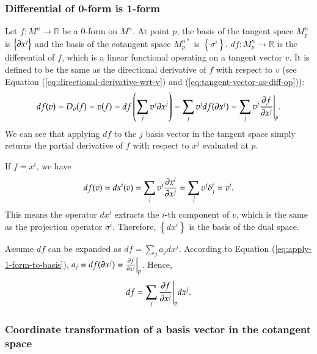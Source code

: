 \documentclass[11pt, a4paper]{book}
\begin{document}
\subsubsection{Differential of 0-form is 1-form}

Let $f: M^n \rightarrow \mathbb{R}$ be a 0-form on $M^n$. At point $p$, the basis of the
tangent space $M_p^n$ is $\left\{ \boldsymbol{\partial}x^j \right\}$ and the basis of the
cotangent space $M_p^{n*}$ is $\left\{ \sigma^i \right\}$.
$df: M_p^n \rightarrow \mathbb{R}$ is the differential of $f$, which is a linear
functional operating on a tangent vector $v$. It is defined to be the same as the
directional derivative of $f$ with respect to $v$ (see Equation
(\ref{eq:directional-derivative-wrt-v}) and (\ref{eq:tangent-vector-as-diff-op})):
\begin{equation}
  \label{eq:df-and-directional-derivative}
  df(v) = D_v(f) = v(f) = df \left( \sum_j v^j \boldsymbol{\partial}x^j \right) = \sum_j v^j
  df(\boldsymbol{\partial}x^j) = \sum_j v^j \frac{\partial f}{\partial x^j}\Bigg\vert_p.
\end{equation}
We can see that applying $df$ to the $j$ basis vector in the tangent space simply returns
the partial derivative of $f$ with respect to $x^j$ evaluated at $p$.

If $f=x^i$, we have
\begin{equation*}
  df(v) = dx^i(v) = \sum_j v^j \frac{\partial x^{i}}{\partial x^j} = \sum_j v^j \delta^i_j = v^i.
\end{equation*}
This means the operator $dx^i$ extracts the $i$-th component of $v$, which is the same as
the projection operator $\sigma^i$. Therefore, $\left\{ dx^i \right\}$ is the basis of the
dual space.

Assume $df$ can be expanded as $df = \sum_j a_j dx^j$. According to Equation
(\ref{eq:apply-1-form-to-basis}),
$a_j = df(\boldsymbol{\partial}x^j) = \frac{\partial f}{\partial x^j} \Big\vert_p$. Hence,
\begin{equation}
  \label{eq:differential-of-0-form}
  df = \sum_j \frac{\partial f}{\partial x^j}\Bigg\vert_p dx^j.
\end{equation}

\subsubsection{Coordinate transformation of a basis vector in the cotangent space}
\end{document}
